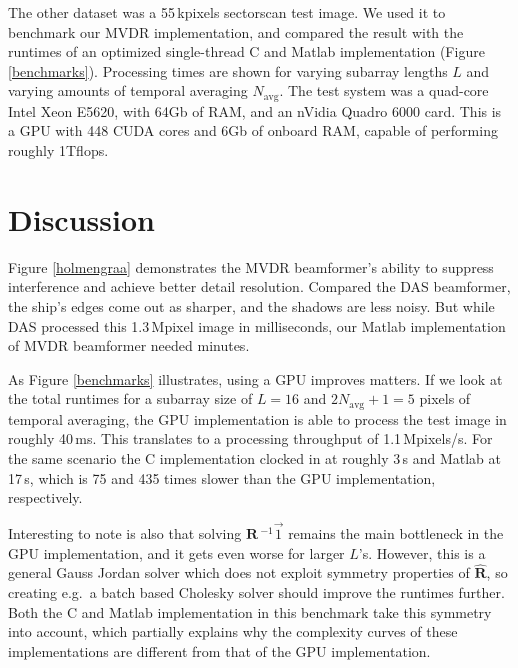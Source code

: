 \documentclass[10pt,a4paper]{article}
\newcommand\Fig[1]{Figure \ref{#1}}
\newcommand\mat[1]{\boldsymbol{#1}}
\newcommand\1{\vec 1}
\newcommand*\eR{\mat{\hat R}}
\newcommand*\eRi{\hat{\mat R}\,\!^{-1}}
\begin{document}
The other dataset was a 55\,kpixels sectorscan test image. We used it to benchmark our \gls{MVDR} implementation, and compared the result with the runtimes of an optimized single-thread C and Matlab implementation (\Fig{benchmarks}). Processing times are shown for varying subarray lengths $L$ and varying amounts of temporal averaging $N_\text{avg}$. The test system was a quad-core Intel Xeon E5620, with 64Gb of \gls{RAM}, and an nVidia Quadro 6000 card. This is a \gls{GPU} with 448 \gls{CUDA} cores and 6Gb of onboard \gls{RAM}, capable of performing roughly 1Tflops.

\section{Discussion}

Figure \ref{holmengraa} demonstrates the \gls{MVDR} beamformer's ability to suppress interference and achieve better detail resolution. Compared the \gls{DAS} beamformer, the ship's edges come out as sharper, and the shadows are less noisy. But while \gls{DAS} processed this 1.3\,Mpixel image in milliseconds, our Matlab implementation of \gls{MVDR} beamformer needed minutes.

As Figure \ref{benchmarks} illustrates, using a \gls{GPU} improves matters. If we look at the total runtimes for a subarray size of $L=16$ and $2N_\text{avg}+1=5$ pixels of temporal averaging, the \gls{GPU} implementation is able to process the test image in roughly 40\,ms. This translates to a processing throughput of 1.1\,Mpixels/s. For the same scenario the C implementation clocked in at roughly 3\,s and Matlab at 17\,s, which is 75 and 435 times slower than the \gls{GPU} implementation, respectively.

Interesting to note is also that solving $\eRi\1$ remains the main bottleneck in the \gls{GPU} implementation, and it gets even worse for larger $L$'s. However, this is a general Gauss Jordan solver which does not exploit symmetry properties of $\eR$, so creating e.g.\ a batch based Cholesky solver should improve the runtimes further. Both the C and Matlab implementation in this benchmark take this symmetry into account, which partially explains why the complexity curves of these implementations are different from that of the \gls{GPU} implementation.


% 
% 
% 
\end{document}
